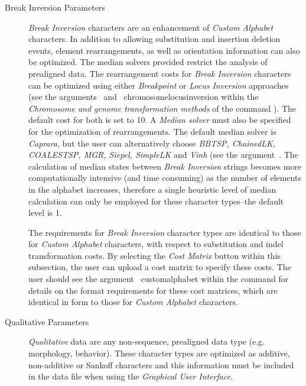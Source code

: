 \begin{description}
	\item [Break Inversion Parameters] \emph{Break Inversion} characters are an enhancement of 				
		\emph{Custom Alphabet} characters. In addition to allowing substitution and insertion deletion events, 
		element rearrangements, as well as orientation information can also be optimized.
		The median solvers provided restrict the analysis of prealigned data. 
		 The rearrangement costs for \emph{Break Inversion} characters can be optimized using 
		 either \emph{Breakpoint} or \emph{Locus Inversion} approaches (see the 
		 arguments~ and~
		 {chromosomelocusinversion} within the \emph{Chromosome and genome transformation methods} 
		 of the command ). The default cost for both is set to 10. A \emph{Median solver} 
		 must also be specified for the optimization of rearrangements. The default median solver is \emph{Caprara}, 
		 but the user can alternatively choose \emph{BBTSP, ChainedLK, COALESTSP, MGR, Siepel, SimpleLK} 
		 and \emph{Vinh} (see the argument~.  
		 The calculation of median states between \emph {Break Inversion} strings becomes more 
		 computationally intensive (and time consuming) as the number of elements in the alphabet 
		 increases, therefore a single heuristic level of median calculation can only be employed 
		 for these character types--the default level is 1.
		 
		\indent The requirements for \emph{Break Inversion} character types are identical to those for 
		 \emph{Custom Alphabet} characters, with respect to substitution and indel transformation costs. 
		 By selecting the  \emph{Cost Matrix} button within this subsection, the user can upload a 
		 cost matrix to specify these costs. The user should see the argument~
		 {customalphabet} within the command  for details on the format requirements 
		 for these cost matrices, which are identical in form to those for \emph{Custom Alphabet} characters.
 	
	\item [Qualitative Parameters] \emph{Qualitative} data are any non-sequence, prealigned 
		data type (e.g. morphology, behavior). These character types are optimized as additive, 
		non-additive or Sankoff characters and this information must be included in the data file when 
		using the \emph{Graphical User Interface}.

	\end{description}
		
